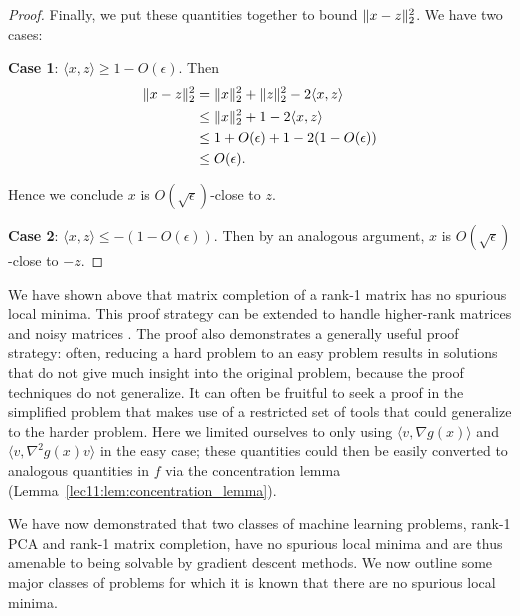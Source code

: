 \begin{proof}
Finally, we put these quantities together to bound $\|x-z\|_2^2$. We have two cases:
    
\textbf{Case 1}: $\langle x,z\rangle \geq 1 - O(\epsilon)$. Then
\begin{align}
\|x-z\|_2^2 &= \|x\|_2^2 + \|z\|_2^2 - 2\langle x,z \rangle \\
&\leq \|x\|_2^2 + 1 - 2\langle x,z \rangle \\
&\leq 1 + O(\epsilon) + 1 - 2(1-O(\epsilon)) \\
&\leq O(\epsilon).
\end{align} 
    
Hence we conclude $x$ is $O(\sqrt{\epsilon})$-close to $z$.
    
\textbf{Case 2}: $\langle x,z\rangle \leq -(1 - O(\epsilon))$. Then by an analogous argument, $x$ is $O(\sqrt{\epsilon})$-close to $-z$.
\end{proof}

We have shown above that matrix completion of a rank-1 matrix has no spurious local minima. This proof strategy can be extended to handle higher-rank matrices and noisy matrices \cite{ge2016}. The proof also demonstrates a generally useful proof strategy: often, reducing a hard problem to an easy problem results in solutions that do not give much insight into the original problem, because the proof techniques do not generalize. It can often be fruitful to seek a proof in the simplified problem that makes use of a restricted set of tools that could generalize to the harder problem. Here we limited ourselves to only using $\langle v, \nabla g(x)\rangle$ and $\langle v, \nabla^2 g(x) v\rangle$ in the easy case; these quantities could then be easily converted to analogous quantities in $f$ via the concentration lemma (Lemma~\ref{lec11:lem:concentration_lemma}).

We have now demonstrated that two classes of machine learning problems, rank-1 PCA and rank-1 matrix completion, have no spurious local minima and are thus amenable to being solvable by gradient descent methods. We now outline some major classes of problems for which it is known that there are no spurious local minima.

